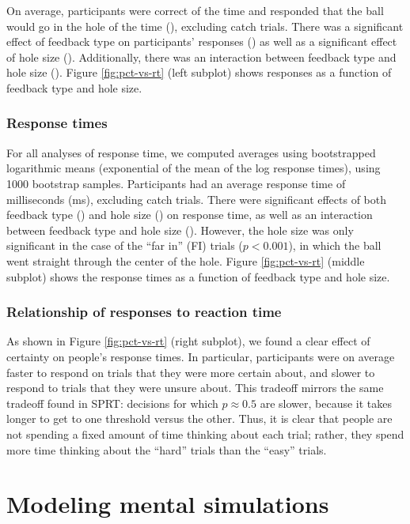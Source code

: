 \documentclass[10pt,letterpaper]{article}
\begin{document}
On average, participants were correct \AvgCorrect{} of the time and responded that the ball would go in the hole \AvgResponse{} of the time (\ResponseN{}), excluding catch trials. There was a significant effect of feedback type on participants' responses (\ResponseHoleClass{}) as well as a significant effect of hole size (\ResponseHoleSize{}). Additionally, there was an interaction between feedback type and hole size (\ResponseFull{}). Figure \ref{fig:pct-vs-rt} (left subplot) shows responses as a function of feedback type and hole size.

\subsubsection{Response times}

For all analyses of response time, we computed averages using bootstrapped logarithmic means (exponential of the mean of the log response times), using 1000 bootstrap samples. Participants had an average response time of \AvgRT{} milliseconds (\StdRT{}ms), excluding catch trials. There were significant effects of both feedback type (\RTHoleClass{}) and hole size (\RTHoleSize{}) on response time, as well as an interaction between feedback type and hole size (\RTFull{}). However, the hole size was only significant in the case of the ``far in'' (FI) trials ($p<0.001$), in which the ball went straight through the center of the hole. Figure \ref{fig:pct-vs-rt} (middle subplot) shows the response times as a function of feedback type and hole size.

\subsubsection{Relationship of responses to reaction time}

As shown in Figure \ref{fig:pct-vs-rt} (right subplot), we found a clear effect of certainty on people's response times. In particular, participants were on average faster to respond on trials that they were more certain about, and slower to respond to trials that they were unsure about. This tradeoff mirrors the same tradeoff found in SPRT: decisions for which $p\approx0.5$ are slower, because it takes longer to get to one threshold versus the other. Thus, it is clear that people are not spending a fixed amount of time thinking about each trial; rather, they spend more time thinking about the ``hard'' trials than the ``easy'' trials.

\section{Modeling mental simulations}
\end{document}
